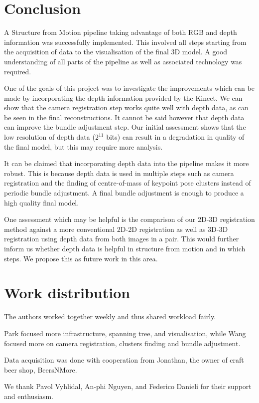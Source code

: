 \documentclass[10pt,twocolumn,letterpaper]{article}
\begin{document}

\section{Conclusion}

A Structure from Motion pipeline taking advantage of both RGB and depth
information was successfully implemented. This involved all steps starting
from the acquisition of data to the visualisation of the final 3D model. A
good understanding of all parts of the pipeline as well as associated technology
was required.

One of the goals of this project was to investigate the improvements which can
be made by incorporating the depth information provided by the Kinect. We can
show that the camera registration step works quite well with depth data, as can
be seen in the final reconstructions. It cannot be said however that depth data
can improve the bundle adjustment step. Our initial assessment shows that the
low resolution of depth data ($2^{11}$ bits) can result in a degradation in
quality of the final model, but this may require more analysis.

It can be claimed that incorporating depth data into the pipeline makes it more
robust. This is because depth data is used in multiple steps such as camera
registration and the finding of centre-of-mass of keypoint pose clusters instead
of periodic bundle adjustment. A final bundle adjustment is enough to produce a
high quality final model.

One assessment which may be helpful is the comparison of our 2D-3D registration
method against a more conventional 2D-2D registration as well as 3D-3D
registration using depth data from both images in a pair. This would further
inform us whether depth data is helpful in structure from motion and in which
steps. We propose this as future work in this area.



\section*{Work distribution}

The authors worked together weekly and thus shared workload fairly.

Park focused more infrastructure, spanning tree, and visualisation, while Wang
focused more on camera registration, clusters finding and bundle adjustment.

Data acquisition was done with cooperation from Jonathan, the owner of craft
beer shop, BeersNMore.

We thank Pavol Vyhlidal, An-phi Nguyen, and Federico Danieli for their support
and enthusiasm.



{\small


}
\end{document}
